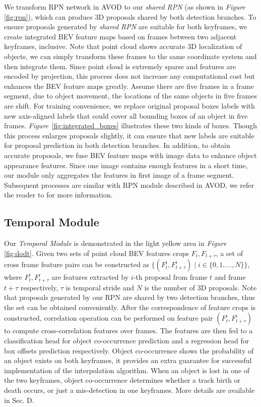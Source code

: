 \documentclass[letterpaper, 10pt, conference]{ieeeconf}  %
\def\figurename{\emph{Figure}}
\begin{document}
We transform RPN network in AVOD \cite{ku2018joint} to our \textit{shared RPN} (as shown in \figurename \, \ref{fig:rpn}), which can produce 3D proposals shared by both detection branches. To ensure proposals generated by \textit{shared RPN} are suitable for both keyframes, we create integrated BEV feature maps based on frames between two adjacent keyframes, inclusive. Note that point cloud shows accurate 3D localization of objects, we can simply transform these frames to the same coordinate system and then integrate them. Since point cloud is extremely sparse and features are encoded by projection, this process does not increase any computational cost but enhances the BEV feature maps greatly. Assume there are five frames in a frame segment, due to object movement, the locations of the same objects in five frames are shift. For training convenience, we replace original proposal boxes labels with new axis-aligned labels that could cover all bounding boxes of an object in five frames. \figurename \, \ref{fig:integrated_boxes} illustrates these two kinds of boxes. Though this process enlarges proposals slightly, it can ensure that new labels are suitable for proposal prediction in both detection branches. In addition, to obtain accurate proposals, we fuse BEV feature maps with image data to enhance object appearance features. Since one image contains enough features in a short time, our module only aggregates the features in first image of a frame segment. Subsequent processes are similar with RPN module described in AVOD, we refer the reader to \cite{ku2018joint} for more information.

\subsection{Temporal Module}
Our \textit{Temporal Module} is demonstrated in the light yellow area in \figurename \, \ref{fig:dodt}. Given two sets of point cloud BEV features crops $F_t, F_{t+\tau}$, a set of cross frame feature pairs can be constructed as $\{(F_t^i, F_{t+\tau}^i)\mid i \in \{0,1,...,N\}\}$, where $F_t^i, F_{t+\tau}^i$ are features extracted by $i$-th proposal from frame $t$ and frame $t+\tau$ respectively, $\tau$ is temporal stride and $N$ is the number of 3D proposals. Note that proposals generated by our RPN are shared by two detection branches, thus the set can be obtained conveniently. After the correspondence of feature crops is constructed, correlation operation can be performed on feature pair $(F_t^i, F_{t+\tau}^i)$ to compute cross-correlation features over frames. The features are then fed to a classification head for object co-occurrence prediction and a regression head for box offsets prediction respectively. Object co-occurrence shows the probability of an object exists on both keyframes, it provides an extra guarantee for successful implementation of the interpolation algorithm. When an object is lost in one of the two keyframes, object co-occurrence determines whether a track birth or death occurs, or just a mis-detection in one keyframes. More details are available in Sec. D.
\end{document}
